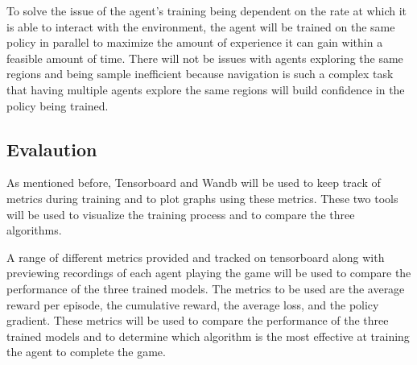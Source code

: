To solve the issue of the agent's training being dependent on the rate at which it is able to interact with the environment, the agent will be trained on the same policy in parallel to maximize the amount of experience it can gain within a feasible amount of time. There will not be issues with agents exploring the same regions and being sample inefficient because navigation is such a complex task that having multiple agents explore the same regions will build confidence in the policy being trained.

\subsection{Evalaution}

As mentioned before, Tensorboard and Wandb will be used to keep track of metrics during training and to plot graphs using these metrics. These two tools will be used to visualize the training process and to compare the three algorithms.

A range of different metrics provided and tracked on tensorboard along with previewing recordings of each agent playing the game will be used to compare the performance of the three trained models. The metrics to be used are the average reward per episode, the cumulative reward, the average loss, and the policy gradient. These metrics will be used to compare the performance of the three trained models and to determine which algorithm is the most effective at training the agent to complete the game.